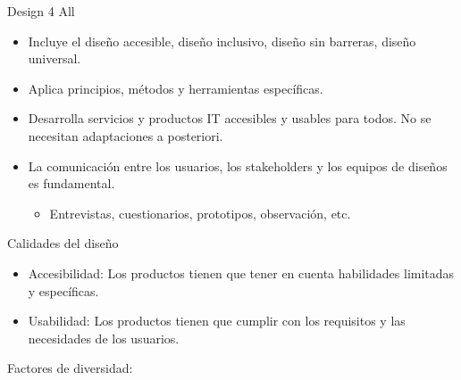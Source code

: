 \documentclass[12pt, twoside, openright]{report} %
\begin{document}
Design 4 All

\begin{itemize}
	\item Incluye el diseño accesible, diseño inclusivo, diseño sin barreras,
	      diseño universal.
	\item Aplica principios, métodos y herramientas específicas.
	\item Desarrolla servicios y productos IT accesibles y usables para todos.
	      No se necesitan adaptaciones a posteriori.
	\item La comunicación entre los usuarios, los stakeholders y los equipos
	      de diseños es fundamental.

	      \begin{itemize}
		      \item Entrevistas, cuestionarios, prototipos, observación, etc.
	      \end{itemize}
\end{itemize}

Calidades del diseño

\begin{itemize}
	\item Accesibilidad: Los productos tienen que tener en cuenta habilidades
	      limitadas y específicas.
	\item Usabilidad: Los productos tienen que cumplir con los requisitos y
	      las necesidades de los usuarios.
\end{itemize}

Factores de diversidad:
\end{document}
